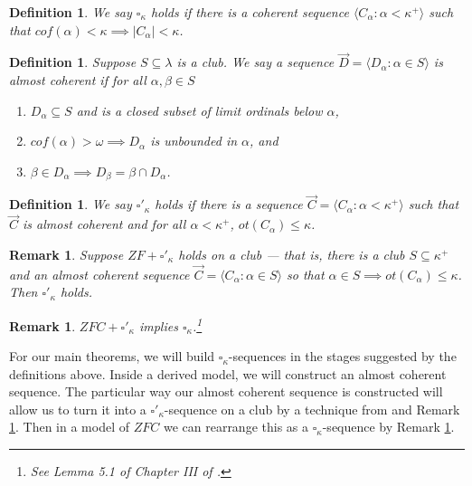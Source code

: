\documentclass[12pt]{article}
\newtheorem{definition}[theorem]{Definition}
\newtheorem{remark}[theorem]{Remark}
\begin{document}
\begin{definition}
    We say $\square_\kappa$ holds if there is a coherent sequence $\langle C_\alpha : \alpha < \kappa^+\rangle$ such that $cof(\alpha) < \kappa \implies |C_\alpha| < \kappa$.
\end{definition}

\begin{definition}
    Suppose $S\subseteq \lambda$ is a club. We say a sequence $\vec{D} = \langle D_\alpha : \alpha \in S\rangle$ is almost coherent if for all $\alpha,\beta\in S$
    \begin{enumerate}
        \item $D_\alpha \subseteq S$ and is a closed subset of limit ordinals below $\alpha$, 
        \item $cof(\alpha)>\omega \implies D_\alpha$ is unbounded in $\alpha$, and
        \item $\beta \in D_\alpha \implies D_\beta = \beta \cap D_\alpha$.
    \end{enumerate}
\end{definition}

\begin{definition}
\label{square prime definition}
    We say $\square'_\kappa$ holds if there is a sequence $\vec{C} = \langle C_\alpha : \alpha < \kappa^+\rangle$ such that $\vec{C}$ is almost coherent and for all $\alpha < \kappa^+$, $ot(C_\alpha) \leq \kappa$.
\end{definition}

\begin{remark}
\label{square' on club implies square'}
    Suppose $ZF + \square'_\kappa$ holds on a club --- that is, there is a club $S\subseteq \kappa^+$ and an almost coherent sequence $\vec{C} = \langle C_\alpha : \alpha\in S\rangle$ so that $\alpha\in S \implies ot(C_\alpha) \leq\kappa$. Then $\square'_\kappa$ holds.
\end{remark}

\begin{remark}
\label{square' implies square}
    $ZFC + \square'_\kappa$ implies $\square_\kappa$.\footnote{See Lemma 5.1 of Chapter III of \cite{Devlin}.}
\end{remark}

For our main theorems, we will build $\square_\kappa$-sequences in the stages suggested by the definitions above. Inside a derived model, we will construct an almost coherent sequence. The particular way our almost coherent sequence is constructed will allow us to turn it into a $\square'_\kappa$-sequence on a club by a technique from \cite{zssquare} and Remark \ref{square' on club implies square'}. Then in a model of $ZFC$ we can rearrange this as a $\square_\kappa$-sequence by Remark \ref{square' implies square}.
\end{document}

